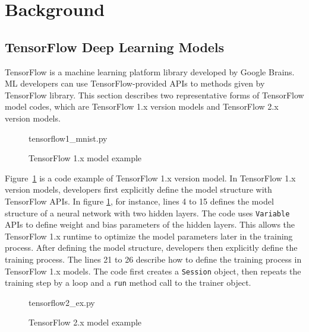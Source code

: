 \section{Background}\label{sec:background}
\subsection{TensorFlow Deep Learning Models}

TensorFlow\cite{tensorflow} is a machine learning platform library
developed by Google Brains.
ML developers can use TensorFlow-provided APIs to 
methods given by TensorFlow library.
This section describes two representative forms of TensorFlow
model codes, which are TensorFlow 1.x version models and 
TensorFlow 2.x version models.

\begin{figure}[ht!]

{tensorflow1_mnist.py}
  \caption{TensorFlow 1.x model example}
\label{fig:back:tf1}
\end{figure}

Figure~\ref{fig:back:tf1} is a code example of TensorFlow 1.x version model.
In TensorFlow 1.x version models, developers first explicitly define
the model structure with TensorFlow APIs.
In figure \ref{fig:back:tf1}, for instance, lines 4 to 15 defines the model
structure of a neural network with two hidden layers.
The code uses {\tt Variable} APIs to define weight and bias parameters of
the hidden layers. This allows the TensorFlow 1.x runtime to
optimize the model parameters later in the training process.
After defining the model structure, developers then
explicitly define the training process.
The lines 21 to 26 describe how to define the training process in TensorFlow
1.x models. The code first creates a {\tt Session} object,
then repeats the training step by a loop and a {\tt run} method call to the
trainer object. 

\begin{figure}[ht!]

{tensorflow2_ex.py}
  \caption{TensorFlow 2.x model example}
\label{fig:back:tf2}
\end{figure}

